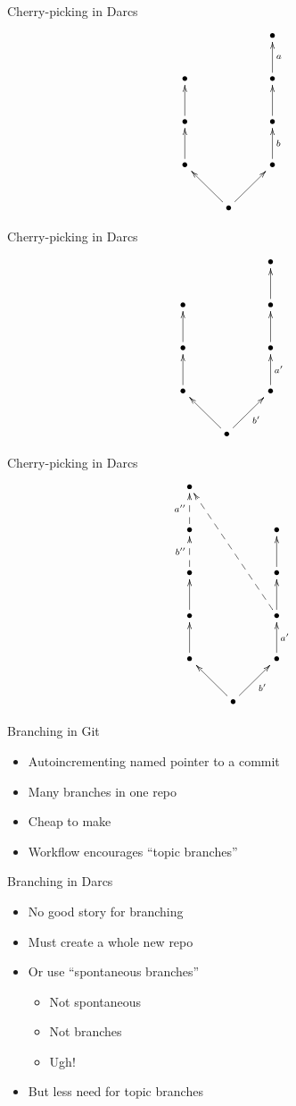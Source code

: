 \documentclass[pdf]{prosper}
\begin{document}
\begin{slide}{Cherry-picking in Darcs}
\[
\xymatrix{
	&& \bullet \\
	\bullet && \bullet \ar[u]_a \\
	\bullet \ar[u] && \bullet \ar[u] \\
	\bullet \ar[u] && \bullet \ar[u]_b \\
	& \bullet \ar[ul] \ar[ur]
}
\]
\end{slide}

\begin{slide}{Cherry-picking in Darcs}
\[
\xymatrix{
	&& \bullet \\
	\bullet && \bullet \ar[u] \\
	\bullet \ar[u] && \bullet \ar[u]_{} \\
	\bullet \ar[u] && \bullet \ar[u]_{a'} \\
	& \bullet \ar[ul] \ar[ur]_{b'}
}
\]
\end{slide}

\begin{slide}{Cherry-picking in Darcs}
\[
\xymatrix{
	\bullet \\
	\bullet \ar@{-->}[u]^{a''} && \bullet \\
	\bullet \ar@{-->}[u]^{b''} && \bullet \ar[u] \\
	\bullet \ar[u] && \bullet \ar[u] \ar@{-->}[uuull] \\
	\bullet \ar[u] && \bullet \ar[u]_{a'} \\
	& \bullet \ar[ul] \ar[ur]_{b'}
}
\]
\end{slide}


\begin{slide}{Branching in Git}
\begin{itemize}
\item Autoincrementing named pointer to a commit
\item Many branches in one repo
\item Cheap to make
\item Workflow encourages ``topic branches''
\end{itemize}
\end{slide}

\begin{slide}{Branching in Darcs}
\begin{itemize}
\item No good story for branching
\item Must create a whole new repo
\item Or use ``spontaneous branches''
\begin{itemize}
\item Not spontaneous
\item Not branches
\item Ugh!
\end{itemize}
\item But less need for topic branches
\end{itemize}
\end{slide}
\end{document}
